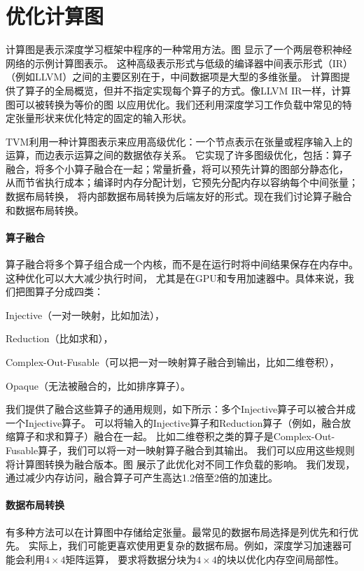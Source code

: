 \section{优化计算图}
计算图是表示深度学习框架中程序的一种常用方法。图 显示了一个两层卷积神经网络的示例计算图表示。
这种高级表示形式与低级的编译器中间表示形式（IR）（例如LLVM）之间的主要区别在于，中间数据项是大型的多维张量。
计算图提供了算子的全局概览，但并不指定实现每个算子的方式。像LLVM IR一样，计算图可以被转换为等价的图
以应用优化。我们还利用深度学习工作负载中常见的特定张量形状来优化特定的固定的输入形状。

TVM利用一种计算图表示来应用高级优化：一个节点表示在张量或程序输入上的运算，而边表示运算之间的数据依存关系。
它实现了许多图级优化，包括：算子融合，将多个小算子融合在一起；常量折叠，将可以预先计算的图部分静态化，
从而节省执行成本；编译时内存分配计划，它预先分配内存以容纳每个中间张量；数据布局转换，
将内部数据布局转换为后端友好的形式。现在我们讨论算子融合和数据布局转换。

\paragraph{算子融合}
算子融合将多个算子组合成一个内核，而不是在运行时将中间结果保存在内存中。这种优化可以大大减少执行时间，
尤其是在GPU和专用加速器中。具体来说，我们把图算子分成四类：
\begin{enumerate*}
    \item Injective（一对一映射，比如加法），
    \item Reduction（比如求和），
    \item Complex-Out-Fusable（可以把一对一映射算子融合到输出，比如二维卷积），
    \item Opaque（无法被融合的，比如排序算子）。
\end{enumerate*}
我们提供了融合这些算子的通用规则，如下所示：多个Injective算子可以被合并成一个Injective算子。
可以将输入的Injective算子和Reduction算子（例如，融合放缩算子和求和算子）融合在一起。
比如二维卷积之类的算子是Complex-Out-Fusable算子，我们可以将一对一映射算子融合到其输出。
我们可以应用这些规则将计算图转换为融合版本。图 展示了此优化对不同工作负载的影响。
我们发现，通过减少内存访问，融合算子可产生高达1.2倍至2倍的加速比。

\paragraph{数据布局转换}
有多种方法可以在计算图中存储给定张量。最常见的数据布局选择是列优先和行优先。
实际上，我们可能更喜欢使用更复杂的数据布局。例如，深度学习加速器可能会利用$4\times 4$矩阵运算，
要求将数据分块为$4\times 4$的块以优化内存空间局部性。

